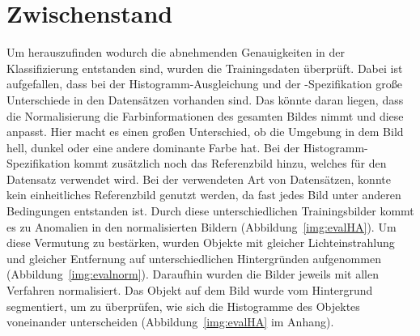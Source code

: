 \section{Zwischenstand}
Um herauszufinden wodurch die abnehmenden Genauigkeiten in der Klassifizierung entstanden sind, wurden die Trainingsdaten überprüft. Dabei ist aufgefallen, dass bei der Histogramm-Ausgleichung und der -Spezifikation große Unterschiede in den Datensätzen vorhanden sind. Das könnte daran liegen, dass die Normalisierung die Farbinformationen des gesamten Bildes nimmt und diese anpasst. Hier macht es einen großen Unterschied, ob die Umgebung in dem Bild hell, dunkel oder eine andere dominante Farbe hat. Bei der Histogramm-Spezifikation kommt zusätzlich noch das Referenzbild hinzu, welches für den Datensatz verwendet wird. Bei der verwendeten Art von Datensätzen, konnte kein einheitliches Referenzbild genutzt werden, da fast jedes Bild unter anderen Bedingungen entstanden ist. Durch diese unterschiedlichen Trainingsbilder kommt es zu Anomalien in den normalisierten Bildern (Abbildung~\ref{img:evalHA}). Um diese Vermutung zu bestärken, wurden Objekte mit gleicher Lichteinstrahlung und gleicher Entfernung auf unterschiedlichen Hintergründen aufgenommen (Abbildung~\ref{img:evalnorm}). Daraufhin wurden die Bilder jeweils mit allen Verfahren normalisiert. Das Objekt auf dem Bild wurde vom Hintergrund segmentiert, um zu überprüfen, wie sich die Histogramme des Objektes voneinander unterscheiden (Abbildung~\ref{img:evalHA} im Anhang).\\

